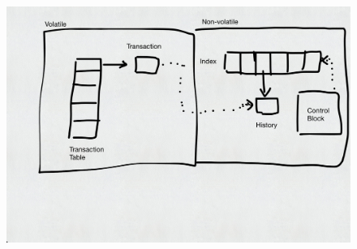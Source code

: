 
\begin{figure}[!ht]
    \centering
    \includegraphics[width=\textwidth]{figures/drafts/concept-struct-complete.pdf}
    \caption{}
    \label{fig:concept-struct-complete}
\end{figure}
